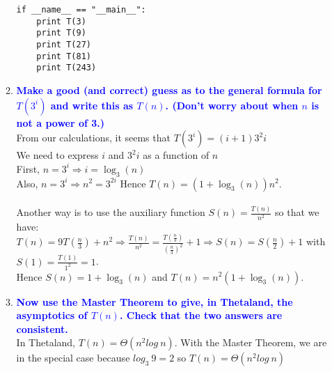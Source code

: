 \documentclass[11pt]{article}
\begin{document}
\begin{enumerate}
\begin{enumerate}
\begin{verbatim}
if __name__ == "__main__":
    print T(3)
    print T(9)
    print T(27)
    print T(81)
    print T(243)
        \end{verbatim}
    \item \textbf{\textcolor{blue}{Make a good (and correct) guess as to the general formula for $T(3^i)$ and write this as $T(n)$. (Don't worry about when $n$ is not a power of 3.)}}
        \\ From our calculations, it seems that $T(3^i) = (i + 1)3^2i$
        \\ We need to express $i$ and $3^2i$ as a function of $n$
        \\ First, $n = 3^i \Rightarrow i = \log_3(n)$
        \\ Also, $n = 3^i \Rightarrow n^2 = 3^{2i}$
        Hence $T(n) = (1 + \log_3(n))n^2$.
        \\\\ Another way is to use the auxiliary function $S(n) = \frac{T(n)}{n^2}$ so that we have:
        \\ $T(n)=9T(\frac{n}{3}) + n^2 \Rightarrow \frac{T(n)}{n^2} = \frac{T(\frac{n}{3})}{(\frac{n}{3})^2} + 1 \Rightarrow 
        S(n) = S(\frac{n}{2}) + 1$ with $S(1)=\frac{T(1)}{1^2}=1$.
        \\ Hence $S(n)=1+\log_3(n)$ and $T(n)=n^2(1+\log_3(n))$.
    \item \textbf{\textcolor{blue}{Now use the Master Theorem to give, in Thetaland, the asymptotics of $T(n)$. Check that the two answers are consistent.}}
        \\ In Thetaland, $T(n) = \Theta(n^2 log\ n)$. With the Master Theorem, we are in the special case because $log_3\ 9 = 2$ so $T(n) = \Theta(n^2 log\ n)$
    \end{enumerate}


\end{enumerate}
\end{document}
